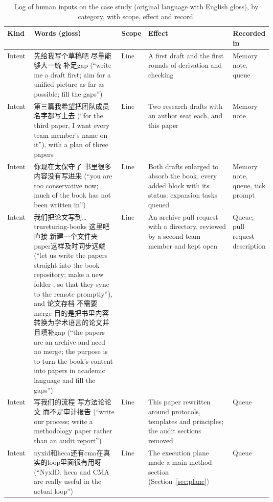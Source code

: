 \documentclass[11pt]{article}
\newcommand{\code}[1]{\texttt{\detokenize{#1}}}
\newcommand{\zh}[1]{#1}
\begin{document}
\begin{table}[htbp]
\centering\scriptsize
\caption{Log of human inputs on the case study (original language with English
gloss), by category, with scope, effect and record.}
\label{tab:interventions}
\begin{tabularx}{\linewidth}{@{}>{\raggedright\arraybackslash}p{0.1\linewidth}>{\raggedright\arraybackslash}p{0.33\linewidth}>{\raggedright\arraybackslash}p{0.07\linewidth}>{\raggedright\arraybackslash}X>{\raggedright\arraybackslash}p{0.13\linewidth}@{}}
\toprule
Kind & Words (gloss) & Scope & Effect & Recorded in \\
\midrule
Intent & \zh{先给我写个草稿吧 尽量能够大一统 补足gap} (``write me a draft first; aim for a unified picture as far as possible; fill the gaps'') & Line & A first draft and the first rounds of derivation and checking & Memory note, queue \\
Intent & \zh{第三篇我希望把团队成员名字都写上去} (``for the third paper, I want every team member's name on it''), with a plan of three papers & Line & Two research drafts with an author seat each, and this paper & Memory note \\
Intent & \zh{你现在太保守了 书里很多内容没有写进来} (``you are too conservative now; much of the book has not been written in'') & Line & Both drafts enlarged to absorb the book, every added block with its status; expansion tasks queued & Memory note, queue, tick prompt \\
Intent & \zh{我们把论文写到…trureturing-books 这里吧直接 新建一个文件夹paper这样及时同步远端} (``let us write the papers straight into the book repository; make a new folder \code{paper}, so that they sync to the remote promptly''), and \zh{论文存档 不需要merge 目的是把书里内容转换为学术语言的论文并且填补gap} (``the papers are an archive and need no merge; the purpose is to turn the book's content into papers in academic language and fill the gaps'') & Line & An archive pull request with a \code{paper/} directory, reviewed by a second team member and kept open & Queue; pull request description \\
Intent & \zh{写我们的流程 写方法论论文 而不是审计报告} (``write our process; write a methodology paper rather than an audit report'') & Line & This paper rewritten around protocols, templates and principles; the audit sections removed & Queue \\
Intent & \zh{nyxid和heca还有cma在真实的loop里面很有用呀} (``NyxID, heca and CMA are really useful in the actual loop'') & Line & The execution plane made a main method section (Section~\ref{sec:plane}) & Queue \\

\end{tabularx}
\end{table}
\end{document}

